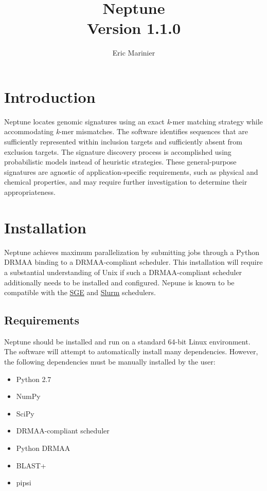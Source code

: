\documentclass[a4paper,10pt]{article}
\title{Neptune \\ \normalsize Version 1.1.0}
\author{Eric Marinier}
\begin{document}
\maketitle

\newpage
\tableofcontents

\newpage
\section{Introduction}

Neptune locates genomic signatures using an exact \textit{k}-mer matching strategy while accommodating \textit{k}-mer mismatches. The software identifies sequences that are sufficiently represented within inclusion targets and sufficiently absent from exclusion targets. The signature discovery process is accomplished using probabilistic models instead of heuristic strategies. These general-purpose signatures are agnostic of application-specific requirements, such as physical and chemical properties, and may require further investigation to determine their appropriateness.

\newpage
\section{Installation}

Neptune achieves maximum parallelization by submitting jobs through a Python DRMAA binding to a DRMAA-compliant scheduler. This installation will require a substantial understanding of Unix if such a DRMAA-compliant scheduler additionally needs to be installed and configured. Nepune is known to be compatible with the \href{http://gridscheduler.sourceforge.net/}{SGE} and \href{http://slurm.schedmd.com/}{Slurm} schedulers.

\subsection{Requirements}

Neptune should be installed and run on a standard 64-bit Linux environment. The software will attempt to automatically install many dependencies. However, the following dependencies must be manually installed by the user:

\begin{itemize}
  \item Python 2.7
  \item NumPy
  \item SciPy
  \item DRMAA-compliant scheduler
  \item Python DRMAA
  \item BLAST+
  \item pipsi
\end{itemize}
\end{document}
